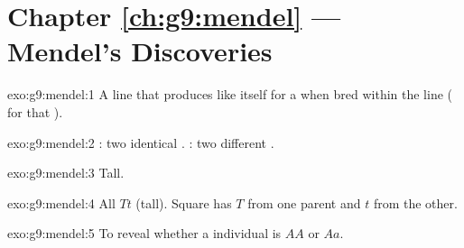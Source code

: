 \section*{Chapter \ref{ch:g9:mendel} --- Mendel's Discoveries}

\begin{solution}{exo:g9:mendel:1}
A line that produces  like itself for a  when bred within
the line ( for that ).
\end{solution}

\begin{solution}{exo:g9:mendel:2}
: two identical . : two different .
\end{solution}

\begin{solution}{exo:g9:mendel:3}
Tall.
\end{solution}

\begin{solution}{exo:g9:mendel:4}
All  $Tt$ (tall). Square has $T$  from one parent and $t$
from the other.
\end{solution}

\begin{solution}{exo:g9:mendel:5}
To reveal whether a  individual is $AA$ or $Aa$.
\end{solution}

